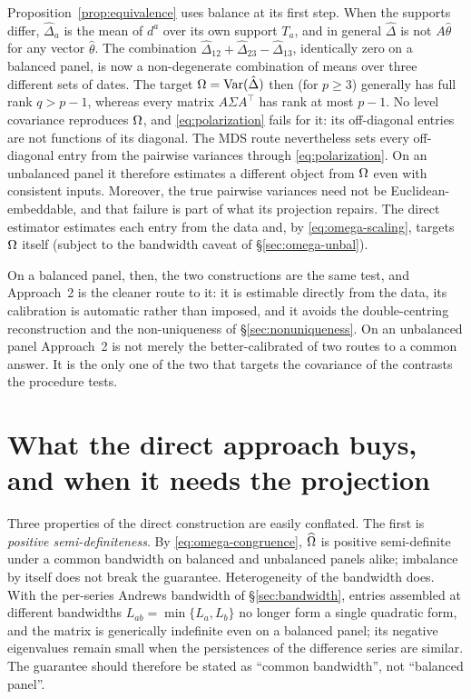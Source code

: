\begin{remark}
\label{rem:unbalanced-targets}
Proposition~\ref{prop:equivalence} uses balance at its first step. When the supports
differ, $\hat\Delta_a$ is the mean of $d^a$ over its own support $T_a$, and in general
$\hat\Delta$ is not $A\hat\theta$ for any vector $\hat\theta$. The combination
$\hat\Delta_{12}+\hat\Delta_{23}-\hat\Delta_{13}$, identically zero on a balanced panel,
is now a non-degenerate combination of means over three different sets of dates. The
target $\Omega=\operatorname{Var}(\hat\Delta)$ then (for $p\ge3$) generally has full rank
$q>p-1$, whereas every matrix $A\Sigma A^\top$ has rank at most $p-1$. No level
covariance reproduces $\Omega$, and \eqref{eq:polarization} fails for it: its
off-diagonal entries are not functions of its diagonal. The MDS route nevertheless sets
every off-diagonal entry from the pairwise variances through \eqref{eq:polarization}. On
an unbalanced panel it therefore estimates a different object from $\Omega$ even
with consistent inputs. Moreover, the true pairwise variances need not be
Euclidean-embeddable, and that failure is part of what its projection repairs. The
direct estimator estimates each entry from the data and, by \eqref{eq:omega-scaling},
targets $\Omega$ itself (subject to the bandwidth caveat of
\S\ref{sec:omega-unbal}).
\end{remark}

On a balanced panel, then, the two constructions are the same test, and Approach~2 is
the cleaner route to it: it is estimable directly from the data, its calibration is
automatic rather than imposed, and it avoids the double-centring reconstruction and the
non-uniqueness of \S\ref{sec:nonuniqueness}. On an unbalanced panel Approach~2 is not
merely the better-calibrated of two routes to a common answer. It is the only one of the
two that targets the covariance of the contrasts the procedure tests.

\section{What the direct approach buys, and when it needs the projection}
\label{sec:caveat}

Three properties of the direct construction are easily conflated. The first is
\emph{positive semi-definiteness}. By \eqref{eq:omega-congruence}, $\widehat{\Omega}$ is
positive semi-definite under a common bandwidth on balanced and unbalanced panels alike;
imbalance by itself does not break the guarantee. Heterogeneity of the bandwidth does.
With the per-series Andrews bandwidth of \S\ref{sec:bandwidth}, entries assembled at
different bandwidths $L_{ab}=\min\{L_a,L_b\}$ no longer form a single quadratic form, and
the matrix is generically indefinite even on a balanced panel; its negative eigenvalues
remain small when the persistences of the difference series are similar. The guarantee
should therefore be stated as ``common bandwidth'', not ``balanced panel''.

